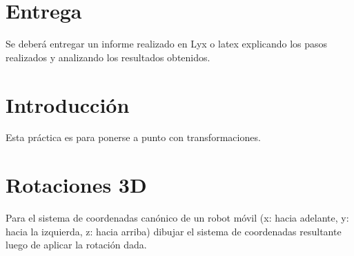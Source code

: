 \documentclass[tp]{lcc}
\begin{document}
\maketitle

\section{Entrega}
Se deberá entregar un informe realizado en Lyx o latex explicando los pasos realizados y analizando los resultados obtenidos.

\section{Introducción}
Esta práctica es para ponerse a punto con transformaciones.

\section{Rotaciones 3D}
Para el sistema de coordenadas canónico de un robot móvil (x: hacia adelante, y: hacia la izquierda, z: hacia arriba) dibujar el sistema de coordenadas resultante luego de aplicar la rotación dada.

\begin{problema}
    
    
\end{problema}
\end{document}
